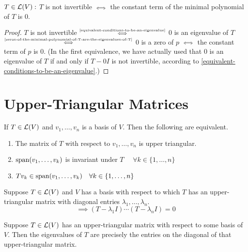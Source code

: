 \begin{thm}
  $T \in \mathcal{L} (V):$ $T$ is not invertible $\mathsmaller{\iff}$ the constant term of the minimal polynomial of $T$ is $0$.
\end{thm}
\begin{proof}
  $T$ is not invertible $\mathsmaller{\overset{\text{\ref{equivalent-conditions-to-be-an-eigenvalue}}}{\iff}}$ $0$ is an eigenvalue of $T$ $\mathsmaller{\overset{\text{\ref{zeros-of-the-minimal-polynomial-of-T-are-the-eigenvalues-of-T}}}{\iff}}$ $0$ is a zero of $p$ $\mathsmaller{\iff}$ the constant term of $p$ is $0$.
  (In the first equivalence, we have actually used that $0$ is an eigenvalue of $T$ if and only if $T-0I$ is not invertible, according to \ref{equivalent-conditions-to-be-an-eigenvalue}.)
\end{proof}

\section{Upper-Triangular Matrices}

\setcounter{thm}{38}
\begin{thm}
  \label{conditions for upper-triangular matrix}
  If $T \in \mathcal{L} (V)$ and $v_1, \dots, v_n$ is a basis of $V$. Then the following are equivalent.
  \begin{enumerate}[label=(\alph*)]
    \item The matrix of $T$ with respect to $v_1, \dots, v_n$ is upper triangular.
    \item $\operatorname{span} (v_1, \dots, v_k)$ is invariant under $T$ $\quad \forall k \in \{ 1, \dots, n\}$
    \item $T v_k \in \operatorname{span} (v_1, \dots, v_k) \quad \forall k \in \{1, \dots, n\}$
  \end{enumerate}
\end{thm}

\begin{thm}
  \label{equation-satisfied-by-operator-with-upper-triangular-matrix}
  Suppose $T\in \mathcal{L}(V)$ and $V$ has a basis with respect to which $T$ has an upper-triangular matrix with diagonal entries $\lambda_1, \dots, \lambda_n$.
  \begin{equation}
    \implies (T-\lambda_1I) \cdots (T-\lambda_nI)=0
  \end{equation}
\end{thm}

\begin{thm}
  \label{determination-of-eigenvalue-from-upper-triangular-matrix}
  Suppose $T\in \mathcal{L}(V)$ has an upper-triangular matrix with respect to some basis of $V$. Then the eigenvalues of $T$ are precisely the entries on the diagonal of that upper-triangular matrix.
\end{thm}

